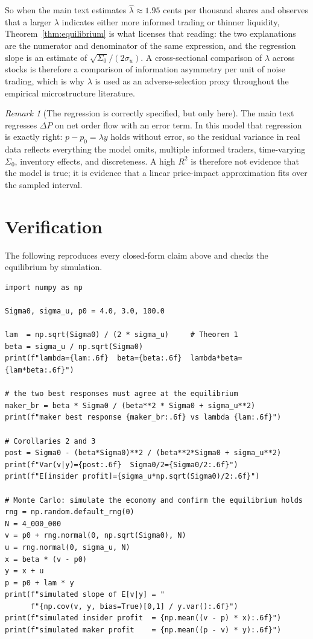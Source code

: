 \documentclass[11pt]{article}
\theoremstyle{remark}
\newtheorem*{remark}{Remark}
\theoremstyle{definition}
\begin{document}
So when the main text estimates $\hat\lambda \approx 1.95$ cents per thousand shares and observes that a larger $\lambda$ indicates either more informed trading or thinner liquidity, Theorem~\ref{thm:equilibrium} is what licenses that reading: the two explanations are the numerator and denominator of the same expression, and the regression slope is an estimate of $\sqrt{\Sigma_0}/(2\sigma_u)$. A cross-sectional comparison of $\hat\lambda$ across stocks is therefore a comparison of information asymmetry per unit of noise trading, which is why $\lambda$ is used as an adverse-selection proxy throughout the empirical microstructure literature.

\begin{remark}[The regression is correctly specified, but only here]
\label{rem:regression}
The main text regresses $\Delta P$ on net order flow with an error term. In this model that regression is exactly right: $p - p_0 = \lambda y$ holds without error, so the residual variance in real data reflects everything the model omits, multiple informed traders, time-varying $\Sigma_0$, inventory effects, and discreteness. A high $R^2$ is therefore not evidence that the model is true; it is evidence that a linear price-impact approximation fits over the sampled interval.
\end{remark}

\section{Verification}
\label{sec:verification}

The following reproduces every closed-form claim above and checks the equilibrium by simulation.

\begin{verbatim}
import numpy as np

Sigma0, sigma_u, p0 = 4.0, 3.0, 100.0

lam  = np.sqrt(Sigma0) / (2 * sigma_u)     # Theorem 1
beta = sigma_u / np.sqrt(Sigma0)
print(f"lambda={lam:.6f}  beta={beta:.6f}  lambda*beta={lam*beta:.6f}")

# the two best responses must agree at the equilibrium
maker_br = beta * Sigma0 / (beta**2 * Sigma0 + sigma_u**2)
print(f"maker best response {maker_br:.6f} vs lambda {lam:.6f}")

# Corollaries 2 and 3
post = Sigma0 - (beta*Sigma0)**2 / (beta**2*Sigma0 + sigma_u**2)
print(f"Var(v|y)={post:.6f}  Sigma0/2={Sigma0/2:.6f}")
print(f"E[insider profit]={sigma_u*np.sqrt(Sigma0)/2:.6f}")

# Monte Carlo: simulate the economy and confirm the equilibrium holds
rng = np.random.default_rng(0)
N = 4_000_000
v = p0 + rng.normal(0, np.sqrt(Sigma0), N)
u = rng.normal(0, sigma_u, N)
x = beta * (v - p0)
y = x + u
p = p0 + lam * y
print(f"simulated slope of E[v|y] = "
      f"{np.cov(v, y, bias=True)[0,1] / y.var():.6f}")
print(f"simulated insider profit  = {np.mean((v - p) * x):.6f}")
print(f"simulated maker profit    = {np.mean((p - v) * y):.6f}")
\end{verbatim}
\end{document}

